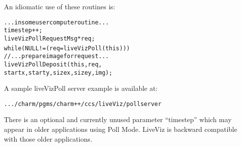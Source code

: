 An idiomatic use of these routines is:
\begin{alltt}
	... in some user compute routine ...
        timestep++;
        liveVizPollRequestMsg *req;
        while (NULL!=(req=liveVizPoll(this))) {
                //...prepare image for request...
                liveVizPollDeposit(this,req,
                        startx,starty,sizex,sizey,img);
        }
\end{alltt}

A sample liveVizPoll server example is available at:
\begin{alltt}
           .../charm/pgms/charm++/ccs/liveViz/pollserver
\end{alltt}

There is an optional and currently unused parameter ``timestep'' which may appear in older 
applications using Poll Mode. LiveViz is backward compatible with those older applications.

